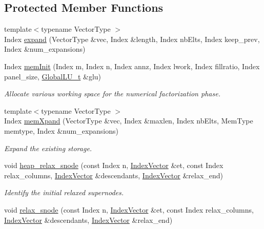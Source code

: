 \subsection*{Protected Member Functions}
\begin{DoxyCompactItemize}
\item 
{\footnotesize template$<$typename Vector\+Type $>$ }\\Index \mbox{\hyperlink{class_eigen_1_1internal_1_1_sparse_l_u_impl_acc7811f7de19ffb804cb4b1fd5288f3e}{expand}} (Vector\+Type \&vec, Index \&length, Index nb\+Elts, Index keep\+\_\+prev, Index \&num\+\_\+expansions)
\item 
Index \mbox{\hyperlink{class_eigen_1_1internal_1_1_sparse_l_u_impl_ac018b8ed9664d4e19e34f1ff2d6c578a}{mem\+Init}} (Index m, Index n, Index annz, Index lwork, Index fillratio, Index panel\+\_\+size, \mbox{\hyperlink{struct_eigen_1_1internal_1_1_l_u___global_l_u__t}{Global\+L\+U\+\_\+t}} \&glu)
\begin{DoxyCompactList}\small\item\em Allocate various working space for the numerical factorization phase. \end{DoxyCompactList}\item 
{\footnotesize template$<$typename Vector\+Type $>$ }\\Index \mbox{\hyperlink{class_eigen_1_1internal_1_1_sparse_l_u_impl_a2a6465f1173fd8b74b2e5b8ceec53343}{mem\+Xpand}} (Vector\+Type \&vec, Index \&maxlen, Index nb\+Elts, Mem\+Type memtype, Index \&num\+\_\+expansions)
\begin{DoxyCompactList}\small\item\em Expand the existing storage. \end{DoxyCompactList}\item 
void \mbox{\hyperlink{class_eigen_1_1internal_1_1_sparse_l_u_impl_a88952ce33c968374b149e31d0539178d}{heap\+\_\+relax\+\_\+snode}} (const Index n, \mbox{\hyperlink{class_eigen_1_1_matrix}{Index\+Vector}} \&et, const Index relax\+\_\+columns, \mbox{\hyperlink{class_eigen_1_1_matrix}{Index\+Vector}} \&descendants, \mbox{\hyperlink{class_eigen_1_1_matrix}{Index\+Vector}} \&relax\+\_\+end)
\begin{DoxyCompactList}\small\item\em Identify the initial relaxed supernodes. \end{DoxyCompactList}\item 
void \mbox{\hyperlink{class_eigen_1_1internal_1_1_sparse_l_u_impl_a33672df380f94e774c5a6919d3474af4}{relax\+\_\+snode}} (const Index n, \mbox{\hyperlink{class_eigen_1_1_matrix}{Index\+Vector}} \&et, const Index relax\+\_\+columns, \mbox{\hyperlink{class_eigen_1_1_matrix}{Index\+Vector}} \&descendants, \mbox{\hyperlink{class_eigen_1_1_matrix}{Index\+Vector}} \&relax\+\_\+end)

\end{DoxyCompactItemize}
